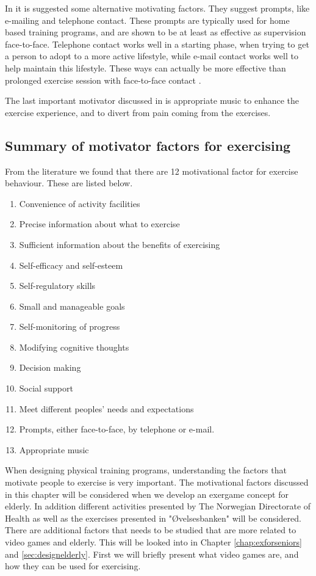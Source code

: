 In \cite{schutzer} it is suggested some alternative motivating factors. They suggest prompts, like e-mailing and telephone contact. These prompts are typically used for home based training programs, and are shown to be at least as effective as supervision face-to-face. Telephone contact works well in a starting phase, when trying to get a person to adopt to a more active lifestyle, while e-mail contact works well to help maintain this lifestyle. These ways can actually be more effective than prolonged exercise session with face-to-face contact \cite{schutzer}. 

The last important motivator discussed in \cite{schutzer} is appropriate music to enhance the exercise experience, and to divert from pain coming from the exercises. 


\subsection{Summary of motivator factors for exercising}
\label{subsec:motivator}

From the literature we found that there are 12 motivational factor for exercise behaviour. These are listed below. 

\begin{enumerate}[{M}.1]
\item Convenience of activity facilities
\item Precise information about what to exercise 
\item Sufficient information about the benefits of exercising
\item Self-efficacy and self-esteem
\item Self-regulatory skills
\item Small and manageable goals
\item Self-monitoring of progress
\item Modifying cognitive thoughts 
\item Decision making
\item Social support
\item Meet different peoples' needs and expectations
\item Prompts, either face-to-face, by telephone or e-mail. 
\item Appropriate music
\end{enumerate} 

\bigskip


When designing physical training programs, understanding the factors that motivate people to exercise is very important. The motivational factors discussed in this chapter will be considered when we develop an exergame concept for elderly. In addition different activities presented by The Norwegian Directorate of Health as well as the exercises presented in "Øvelsesbanken" will be considered. There are additional factors that needs to be studied that are more related to video games and elderly. This will be looked into in Chapter \ref{chap:exforseniors} and \ref{sec:designelderly}. First we will briefly present what video games are, and how they can be used for exercising. 




